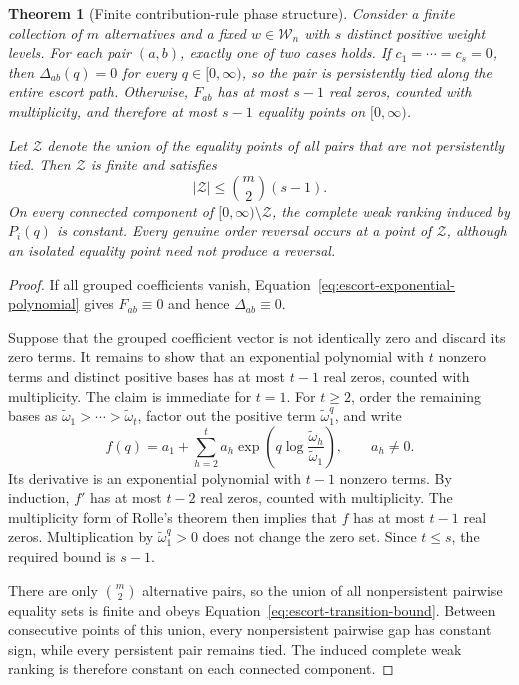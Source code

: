 \documentclass[reqno,11pt]{amsart}
\theoremstyle{definition}
\theoremstyle{plain}
\newtheorem{theorem}{Theorem}
\theoremstyle{remark}
\begin{document}
\begin{theorem}[Finite contribution-rule phase structure]
\label{thm:finite-escort-phases}
Consider a finite collection of \(m\) alternatives and a fixed
\(w\in\mathcal W_n\) with \(s\) distinct positive weight levels. For each
pair \((a,b)\), exactly one of two cases holds. If
\(c_1=\cdots=c_s=0\), then \(\Delta_{ab}(q)=0\) for every
\(q\in[0,\infty)\), so the pair is persistently tied along the entire
escort path. Otherwise, \(F_{ab}\) has at most \(s-1\) real zeros,
counted with multiplicity, and therefore at most \(s-1\) equality points
on \([0,\infty)\).

Let \(\mathcal Z\) denote the union of the equality points of all pairs
that are not persistently tied. Then \(\mathcal Z\) is finite and satisfies
\begin{equation}
|\mathcal Z|
\leq
\binom{m}{2}(s-1).
\label{eq:escort-transition-bound}
\end{equation}
On every connected component of
\([0,\infty)\setminus\mathcal Z\), the complete weak ranking induced by
\(P_i(q)\) is constant. Every genuine order reversal occurs at a point of
\(\mathcal Z\), although an isolated equality point need not produce a
reversal.
\end{theorem}

\begin{proof}
If all grouped coefficients vanish,
Equation~\eqref{eq:escort-exponential-polynomial} gives
\(F_{ab}\equiv0\) and hence \(\Delta_{ab}\equiv0\).

Suppose that the grouped coefficient vector is not identically zero and
discard its zero terms. It remains to show that an exponential polynomial
with \(t\) nonzero terms and distinct positive bases has at most \(t-1\)
real zeros, counted with multiplicity. The claim is immediate for \(t=1\).
For \(t\geq2\), order the remaining bases as
\(\widetilde\omega_1>\cdots>\widetilde\omega_t\), factor out the positive
term \(\widetilde\omega_1^q\), and write
\[
f(q)
=
a_1
+
\sum_{h=2}^{t}a_h
\exp\left(
q\log\frac{\widetilde\omega_h}{\widetilde\omega_1}
\right),
\qquad a_h\neq0.
\]
Its derivative is an exponential polynomial with \(t-1\) nonzero terms.
By induction, \(f'\) has at most \(t-2\) real zeros, counted with
multiplicity. The multiplicity form of Rolle's theorem then implies that
\(f\) has at most \(t-1\) real zeros. Multiplication by
\(\widetilde\omega_1^q>0\) does not change the zero set. Since
\(t\leq s\), the required bound is \(s-1\).

There are only \(\binom{m}{2}\) alternative pairs, so the union of all
nonpersistent pairwise equality sets is finite and obeys
Equation~\eqref{eq:escort-transition-bound}. Between consecutive points of
this union, every nonpersistent pairwise gap has constant sign, while every
persistent pair remains tied. The induced complete weak ranking is
therefore constant on each connected component.
\end{proof}
\end{document}
